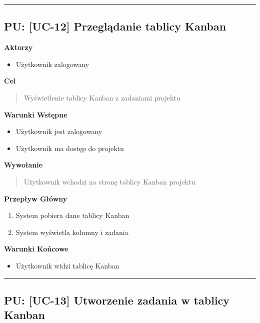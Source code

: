 \hrule
\vspace{1cm}

\subsection*{PU: [UC-12] Przeglądanie tablicy Kanban}

\noindent\textbf{Aktorzy}
\begin{itemize}
    \item Użytkownik zalogowany
\end{itemize}

\vspace{0.2cm}
\noindent\textbf{Cel}
\begin{quote}
    Wyświetlenie tablicy Kanban z zadaniami projektu
\end{quote}

\vspace{0.2cm}
\noindent\textbf{Warunki Wstępne}
\begin{itemize}
    \item Użytkownik jest zalogowany
    \item Użytkownik ma dostęp do projektu
\end{itemize}

\vspace{0.2cm}
\noindent\textbf{Wywołanie}
\begin{quote}
    Użytkownik wchodzi na stronę tablicy Kanban projektu
\end{quote}

\vspace{0.2cm}
\noindent\textbf{Przepływ Główny}
\begin{enumerate}
    \item System pobiera dane tablicy Kanban
    \item System wyświetla kolumny i zadania
\end{enumerate}

\vspace{0.2cm}
\noindent\textbf{Warunki Końcowe}
\begin{itemize}
    \item Użytkownik widzi tablicę Kanban
\end{itemize}


\hrule
\vspace{1cm}

\subsection*{PU: [UC-13] Utworzenie zadania w tablicy Kanban}

